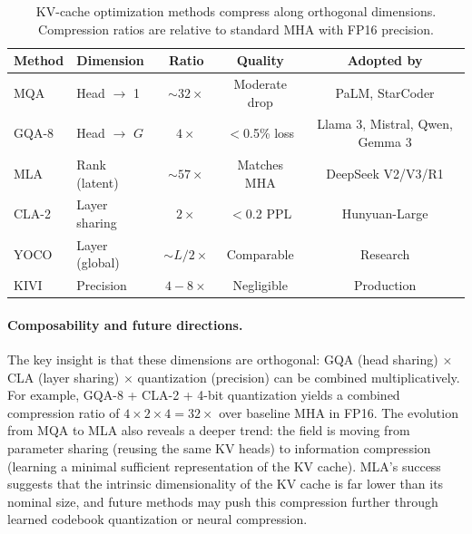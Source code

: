 \begin{table}[t]
\centering
\caption{KV-cache optimization methods compress along orthogonal dimensions. Compression ratios are relative to standard MHA with FP16 precision.}
\label{tab:kv-cache}
\small
\begin{tabular}{llccc}
\toprule
\textbf{Method} & \textbf{Dimension} & \textbf{Ratio} & \textbf{Quality} & \textbf{Adopted by} \\
\midrule
MQA~\cite{shazeer2019fast}  & Head $\to$ 1    & ${\sim}32\times$  & Moderate drop    & PaLM, StarCoder \\
GQA-8~\cite{ainslie2023gqa} & Head $\to$ $G$  & $4\times$         & $<$0.5\% loss    & Llama 3, Mistral, Qwen, Gemma 3 \\
MLA~\cite{deepseekv2_2024_mla}  & Rank (latent) & ${\sim}57\times$ & Matches MHA & DeepSeek V2/V3/R1 \\
CLA-2~\cite{brandon2024reducing} & Layer sharing   & $2\times$         & $<$0.2 PPL    & Hunyuan-Large \\
YOCO~\cite{sun2024yoco}     & Layer (global)  & ${\sim}L/2\times$ & Comparable    & Research \\
KIVI~\cite{liu2024kivi}     & Precision       & $4{-}8\times$     & Negligible    & Production \\
\bottomrule
\end{tabular}
\end{table}

\paragraph{Composability and future directions.}
The key insight is that these dimensions are orthogonal: GQA (head sharing) $\times$ CLA (layer sharing) $\times$ quantization (precision) can be combined multiplicatively. For example, GQA-8 + CLA-2 + 4-bit quantization yields a combined compression ratio of $4 \times 2 \times 4 = 32\times$ over baseline MHA in FP16. The evolution from MQA to MLA also reveals a deeper trend: the field is moving from parameter sharing (reusing the same KV heads) to information compression (learning a minimal sufficient representation of the KV cache). MLA's success suggests that the intrinsic dimensionality of the KV cache is far lower than its nominal size, and future methods may push this compression further through learned codebook quantization or neural compression.



